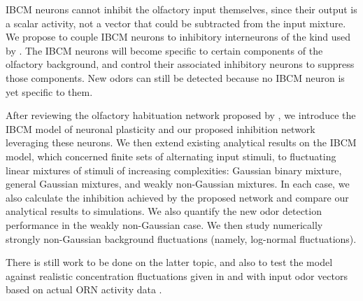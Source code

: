 IBCM neurons cannot inhibit the olfactory input themselves, since their output is a scalar activity, not a vector that could be subtracted from the input mixture. We propose to couple IBCM neurons to inhibitory interneurons of the kind used by \cite{shen_habituation_2020}. The IBCM neurons will become specific to certain components of the olfactory background, and control their associated inhibitory neurons to suppress those components. New odors can still be detected because no IBCM neuron is yet specific to them. 

After reviewing the olfactory habituation network proposed by \cite{shen_habituation_2020}, we introduce the IBCM model of neuronal plasticity and our proposed inhibition network leveraging these neurons. We then extend existing analytical results on the IBCM model, which concerned finite sets of alternating input stimuli, to fluctuating linear mixtures of stimuli of increasing complexities: Gaussian binary mixture, general Gaussian mixtures, and weakly non-Gaussian mixtures. In each case, we also calculate the inhibition achieved by the proposed network and compare our analytical results to simulations. We also quantify the new odor detection performance in the weakly non-Gaussian case. We then study numerically strongly non-Gaussian background fluctuations (namely, log-normal fluctuations). 

There is still work to be done on the latter topic, and also to test the model against realistic concentration fluctuations given in \cite{celani_odor_2014} and with input odor vectors based on actual ORN activity data \cite{hallem_coding_2006}. 



